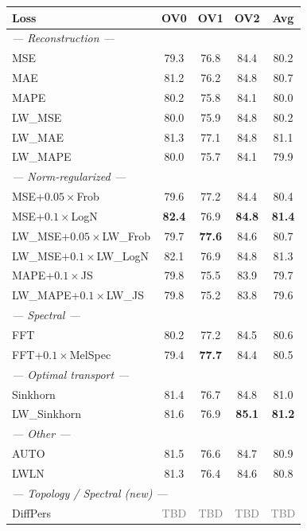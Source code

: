 \begin{table}[t]
\centering\small
\setlength{\tabcolsep}{4pt}
\begin{tabular}{lcccc}
\hline
\textbf{Loss} & \textbf{OV0} & \textbf{OV1} & \textbf{OV2} & \textbf{Avg} \\
\hline
\multicolumn{5}{l}{\textit{--- Reconstruction ---}} \\
MSE           & 79.3 & 76.8 & 84.4 & 80.2 \\
MAE           & 81.2 & 76.2 & 84.8 & 80.7 \\
MAPE          & 80.2 & 75.8 & 84.1 & 80.0 \\
LW\_MSE       & 80.0 & 75.9 & 84.8 & 80.2 \\
LW\_MAE       & 81.3 & 77.1 & 84.8 & 81.1 \\
LW\_MAPE      & 80.0 & 75.7 & 84.1 & 79.9 \\
\hline
\multicolumn{5}{l}{\textit{--- Norm-regularized ---}} \\
MSE+$0.05\times$Frob  & 79.6 & 77.2 & 84.4 & 80.4 \\
MSE+$0.1\times$LogN   & \textbf{82.4} & 76.9 & \textbf{84.8} & \textbf{81.4} \\
LW\_MSE+$0.05\times$LW\_Frob & 79.7 & \textbf{77.6} & 84.6 & 80.7 \\
LW\_MSE+$0.1\times$LW\_LogN  & 82.1 & 76.9 & 84.8 & 81.3 \\
MAPE+$0.1\times$JS    & 79.8 & 75.5 & 83.9 & 79.7 \\
LW\_MAPE+$0.1\times$LW\_JS & 79.8 & 75.2 & 83.8 & 79.6 \\
\hline
\multicolumn{5}{l}{\textit{--- Spectral ---}} \\
FFT           & 80.2 & 77.2 & 84.5 & 80.6 \\
FFT+$0.1\times$MelSpec & 79.4 & \textbf{77.7} & 84.4 & 80.5 \\
\hline
\multicolumn{5}{l}{\textit{--- Optimal transport ---}} \\
Sinkhorn      & 81.4 & 76.7 & 84.8 & 81.0 \\
LW\_Sinkhorn  & 81.6 & 76.9 & \textbf{85.1} & \textbf{81.2} \\
\hline
\multicolumn{5}{l}{\textit{--- Other ---}} \\
AUTO          & 81.5 & 76.6 & 84.7 & 80.9 \\
LWLN          & 81.3 & 76.4 & 84.6 & 80.8 \\
\hline
\multicolumn{5}{l}{\textit{--- Topology / Spectral (new) ---}} \\
DiffPers      & \textcolor{gray}{TBD} & \textcolor{gray}{TBD} & \textcolor{gray}{TBD} & \textcolor{gray}{TBD} \\

\end{tabular}
\end{table}
